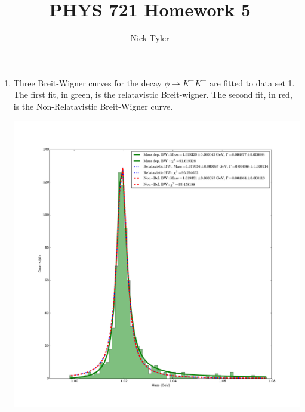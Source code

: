 \documentclass[pdftex]{article}
\title{PHYS 721 Homework 5}
\author{Nick Tyler}
\date{}
\begin{document}
\maketitle
\begin{enumerate}
	\item Three Breit-Wigner curves for the decay $\phi \rightarrow K^{+} K^{- }$ are fitted to data set 1. 
		The first fit, in green, is the relatavistic Breit-wigner. The second fit, in red, is the Non-Relatavistic
		Breit-Wigner curve. \

		\includegraphics[scale=0.35]{Problem_1_and_2.pdf}\\
		

\end{enumerate}
\end{document}
